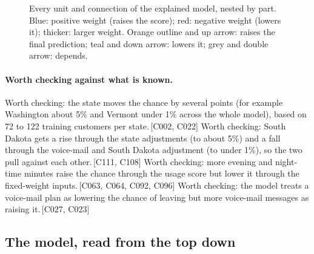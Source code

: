 \documentclass[a4paper,10pt]{article}
\newif\ifreviewmarks
\newcommand{\reviewrule}{\noindent{\color{BrickRed}\rule{\linewidth}{0.8pt}}}
\newenvironment{drafted}[1][]{%
  \ifreviewmarks\par\addvspace{\medskipamount}\reviewrule\par\nopagebreak
  \noindent{\color{BrickRed}\sffamily\footnotesize\textbf{Thesis Draft}\quad #1\hfill review}\par\nopagebreak\smallskip\fi}{%
  \ifreviewmarks\par\smallskip\noindent{\color{BrickRed}\sffamily\footnotesize end of thesis draft}\par\nopagebreak\reviewrule\par\medskip\fi}
\begin{document}
\begin{drafted}[plain-language layer: churn100-s7-c1]
\begin{landscape}
\begin{figure}[p]
{}%
\caption{Every unit and connection of the explained model, nested by part. Blue: positive weight (raises the score); red: negative weight (lowers it); thicker: larger weight. Orange outline and up arrow: raises the final prediction; teal and down arrow: lowers it; grey and double arrow: depends.}
\label{fig:churn100s7c1:overview}
\end{figure}
\end{landscape}
\paragraph{Worth checking against what is known.} Worth checking: the state moves the chance by several points (for example Washington about 5\% and Vermont under 1\% across the whole model), based on 72 to 122 training customers per state.\,{\scriptsize\textcolor{NavyBlue}{[C002, C022]}} Worth checking: South Dakota gets a rise through the state adjustments (to about 5\%) and a fall through the voice-mail and South Dakota adjustment (to under 1\%), so the two pull against each other.\,{\scriptsize\textcolor{NavyBlue}{[C111, C108]}} Worth checking: more evening and night-time minutes raise the chance through the usage score but lower it through the fixed-weight inputs.\,{\scriptsize\textcolor{NavyBlue}{[C063, C064, C092, C096]}} Worth checking: the model treats a voice-mail plan as lowering the chance of leaving but more voice-mail messages as raising it.\,{\scriptsize\textcolor{NavyBlue}{[C027, C023]}}
\subsection{The model, read from the top down}

\end{drafted}
\end{document}
